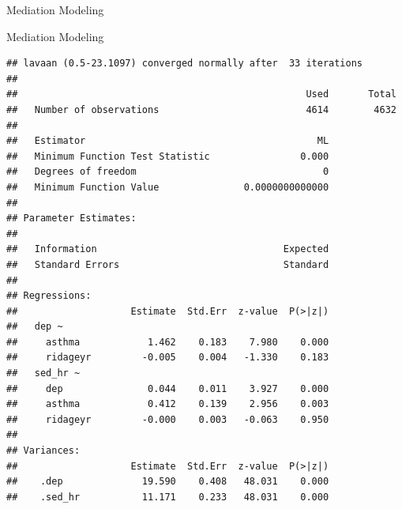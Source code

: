 \begin{frame}[fragile]{Mediation Modeling}

\footnotesize

\begin{Shaded}
\begin{Highlighting}[]
\NormalTok{ <-}
\NormalTok{ <-}\StringTok{ }\NormalTok{, }
\NormalTok{)}
\end{Highlighting}
\end{Shaded}

\end{frame}

\begin{frame}[fragile]{Mediation Modeling}

\tiny

\begin{verbatim}
## lavaan (0.5-23.1097) converged normally after  33 iterations
## 
##                                                   Used       Total
##   Number of observations                          4614        4632
## 
##   Estimator                                         ML
##   Minimum Function Test Statistic                0.000
##   Degrees of freedom                                 0
##   Minimum Function Value               0.0000000000000
## 
## Parameter Estimates:
## 
##   Information                                 Expected
##   Standard Errors                             Standard
## 
## Regressions:
##                    Estimate  Std.Err  z-value  P(>|z|)
##   dep ~                                               
##     asthma            1.462    0.183    7.980    0.000
##     ridageyr         -0.005    0.004   -1.330    0.183
##   sed_hr ~                                            
##     dep               0.044    0.011    3.927    0.000
##     asthma            0.412    0.139    2.956    0.003
##     ridageyr         -0.000    0.003   -0.063    0.950
## 
## Variances:
##                    Estimate  Std.Err  z-value  P(>|z|)
##    .dep              19.590    0.408   48.031    0.000
##    .sed_hr           11.171    0.233   48.031    0.000
\end{verbatim}

\end{frame}

